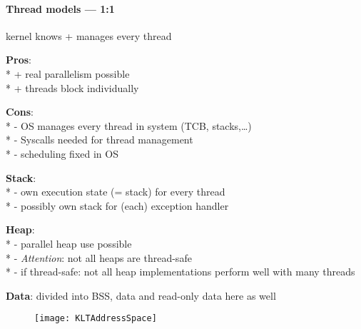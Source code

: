 \paragraph{Thread models --- 1:1}
\begin{items}
  \item kernel knows + manages every thread
  \item \textbf{Pros}: \\*
    + real parallelism possible \\*
    + threads block individually
  \item \textbf{Cons}: \\*
    - OS manages every thread in system (TCB, stacks,\dots) \\*
    - Syscalls needed for thread management \\*
    - scheduling fixed in OS
  \item \textbf{Stack}: \\*
    - own execution state (= stack) for every thread \\*
    - possibly own stack for (each) exception handler
  \item \textbf{Heap}: \\*
    - parallel heap use possible \\*
    - \emph{Attention}: not all heaps are thread-safe \\*
    - if thread-safe: not all heap implementations perform well with many threads
  \item \textbf{Data}: divided into BSS, data and read-only data here as well
\end{items}
\begin{figure}[H]\centering\label{KLTAddressSpace}\texttt{[image: KLTAddressSpace]}\end{figure}

